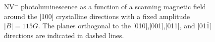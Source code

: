 \documentclass[9pt,twocolumn,twoside]{osajnl}
\begin{document}
\begin{figure}[htbp]
\centering
{}
\caption{NV$^-$ photoluminescence as a function of a scanning magnetic field around the [100] crystalline directions with a fixed amplitude $|B|=115G$. The planes orthogonal to the [010],[001],[011], and [01$\bar 1$] directions are indicated in dashed lines.}
\label{map}
\end{figure}
\end{document}
